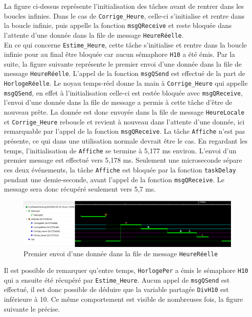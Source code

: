 \documentclass[french]{article}
\begin{document}
	La figure ci-dessus représente l'initialisation des tâches avant de rentrer dans les boucles infinies. Dans le cas de \texttt{Corrige\_Heure}, celle-ci s'initialise et rentre dans la boucle infinie, puis appelle la fonction \texttt{msgQReceive} et reste bloquée dans l'attente d'une donnée dans la file de message \texttt{HeureRéelle}.\\
	En ce qui concerne \texttt{Estime\_Heure}, cette tâche s'initialise et rentre dans la boucle infinie pour au final être bloquée car aucun sémaphore \texttt{H10} a été émis. Par la suite, la figure suivante représente le premier envoi d'une donnée dans la file de message \texttt{HeureRéelle}. L'appel de la fonction \texttt{msgQSend} est effectué de la part de \texttt{HorlogeRéelle}. Le noyau temps-réel donne la main à \texttt{Corrige\_Heure} qui appelle \texttt{msgQSend}, en effet à l'initialisation celle-ci est restée bloquée avec \texttt{msgQReceive}, l'envoi d'une donnée dans la file de message a permis à cette tâche d'être de nouveau prête. La donnée est donc envoyée dans la file de message \texttt{HeureLocale} et \texttt{Corrige\_Heure} reboucle et revient à nouveau dans l'attente d'une donnée, ici remarquable par l'appel de la fonction \texttt{msgQReceive}. La tâche \texttt{Affiche} n'est pas présente, ce qui dans une utilisation normale devrait être le cas. En regardant les temps, l'initialisation de \texttt{Affiche} se termine à 5,177 ms environ. L'envoi d'un premier message est effectué vers 5,178 ms. Seulement une microseconde sépare ces deux événements, la tâche \texttt{Affiche} est bloquée par la fonction \texttt{taskDelay} pendant une demie-seconde, avant l'appel de la fonction \texttt{msgQReceive}. Le message sera donc récupéré seulement vers 5,7 ms.
	
	\begin{figure}[H]
		\centering
		\includegraphics[width=1\linewidth]{../affichage_ralenti/1er_envoi_HeureReelle.PNG}
		\caption{Premier envoi d'une donnée dans la file de message \texttt{HeureRéelle}}
		\label{fig:premier_envoie_heurereelle}
	\end{figure}

	Il est possible de remarquer qu'entre temps, \texttt{HorlogePer} a émis le sémaphore \texttt{H10} qui a ensuite été récupéré par \texttt{Estime\_Heure}. Aucun appel de \texttt{msgQSend} est effectué, il est donc possible de déduire que la variable partagée \texttt{DivH10} est inférieure à 10. Ce même comportement est visible de nombreuses fois, la figure suivante le précise.
	
\end{document}
